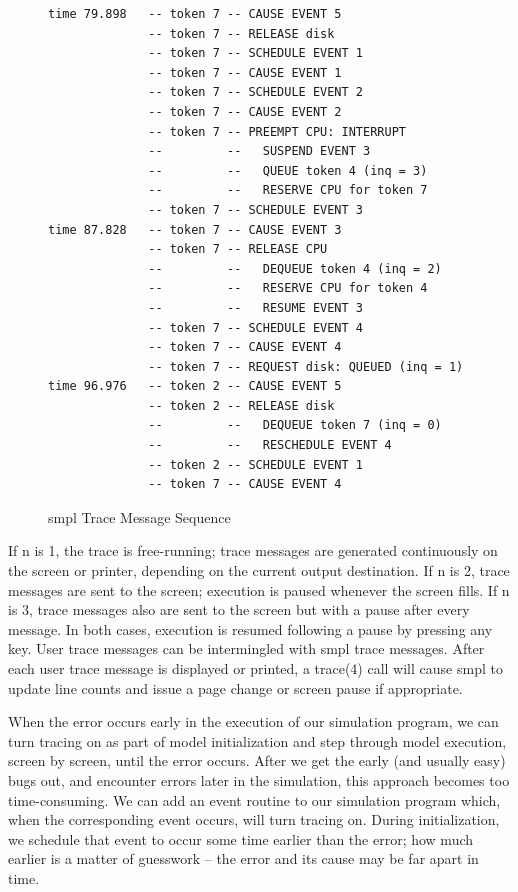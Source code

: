 \begin{figure}[H]
\centering
\begingroup\fontsize{7}{8}\selectfont
\begin{verbatim}
time 79.898   -- token 7 -- CAUSE EVENT 5
              -- token 7 -- RELEASE disk
              -- token 7 -- SCHEDULE EVENT 1
              -- token 7 -- CAUSE EVENT 1
              -- token 7 -- SCHEDULE EVENT 2
              -- token 7 -- CAUSE EVENT 2
              -- token 7 -- PREEMPT CPU: INTERRUPT
              --         --   SUSPEND EVENT 3
              --         --   QUEUE token 4 (inq = 3)
              --         --   RESERVE CPU for token 7
              -- token 7 -- SCHEDULE EVENT 3
time 87.828   -- token 7 -- CAUSE EVENT 3
              -- token 7 -- RELEASE CPU
              --         --   DEQUEUE token 4 (inq = 2)
              --         --   RESERVE CPU for token 4
              --         --   RESUME EVENT 3
              -- token 7 -- SCHEDULE EVENT 4
              -- token 7 -- CAUSE EVENT 4
              -- token 7 -- REQUEST disk: QUEUED (inq = 1)
time 96.976   -- token 2 -- CAUSE EVENT 5
              -- token 2 -- RELEASE disk
              --         --   DEQUEUE token 7 (inq = 0)
              --         --   RESCHEDULE EVENT 4
              -- token 2 -- SCHEDULE EVENT 1
              -- token 7 -- CAUSE EVENT 4
\end{verbatim}
\endgroup
\caption{smpl Trace Message Sequence}
\end{figure}

If n is 1, the trace is free-running; trace messages are generated
continuously on the screen or printer, depending on the current output
destination. If n is 2, trace messages are sent to the screen; execution is
paused whenever the screen fills. If n is 3, trace messages also are sent to
the screen but with a pause after every message. In both cases, execution is
resumed following a pause by pressing any key. User trace messages can be
intermingled with smpl trace messages. After each user trace message is
displayed or printed, a trace(4) call will cause smpl to update line counts and
issue a page change or screen pause if appropriate.

When the error occurs early in the execution of our simulation program, we can
turn tracing on as part of model initialization and step through model
execution, screen by screen, until the error occurs. After we get the early
(and usually easy) bugs out, and encounter errors later in the simulation,
this approach becomes too time-consuming. We can add an event routine to our
simulation program which, when the corresponding event occurs, will turn
tracing on. During initialization, we schedule that event to occur some time
\noindent earlier than the error; how much earlier is a matter of guesswork -- the error
and its cause may be far apart in time.

